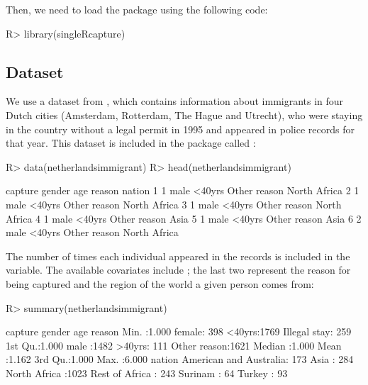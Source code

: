 \documentclass[
]{jss}
\newcommand{\1}{\mathcal{I}} \newcommand{\bZero}{\boldsymbol{0}}
\begin{document}
Then, we need to load the package using the following code:

\begin{CodeChunk}
\begin{CodeInput}
R> library(singleRcapture)
\end{CodeInput}
\end{CodeChunk}

\subsection{Dataset}\label{dataset}

We use a dataset from \cite{ztpoisson}, which contains information about
immigrants in four Dutch cities (Amsterdam, Rotterdam, The Hague and
Utrecht), who were staying in the country without a legal permit in 1995
and appeared in police records for that year. This dataset is included
in the package called :

\begin{CodeChunk}
\begin{CodeInput}
R> data(netherlandsimmigrant)
R> head(netherlandsimmigrant)
\end{CodeInput}
\begin{CodeOutput}
  capture gender    age       reason       nation
1       1   male <40yrs Other reason North Africa
2       1   male <40yrs Other reason North Africa
3       1   male <40yrs Other reason North Africa
4       1   male <40yrs Other reason         Asia
5       1   male <40yrs Other reason         Asia
6       2   male <40yrs Other reason North Africa
\end{CodeOutput}
\end{CodeChunk}

The number of times each individual appeared in the records is included
in the  variable. The available covariates include
; the last two represent the reason
for being captured and the region of the world a given person comes
from:

\begin{CodeChunk}
\begin{CodeInput}
R> summary(netherlandsimmigrant)
\end{CodeInput}
\begin{CodeOutput}
    capture         gender         age                reason    
 Min.   :1.000   female: 398   <40yrs:1769   Illegal stay: 259  
 1st Qu.:1.000   male  :1482   >40yrs: 111   Other reason:1621  
 Median :1.000                                                  
 Mean   :1.162                                                  
 3rd Qu.:1.000                                                  
 Max.   :6.000                                                  
                    nation    
 American and Australia: 173  
 Asia                  : 284  
 North Africa          :1023  
 Rest of Africa        : 243  
 Surinam               :  64  
 Turkey                :  93  
\end{CodeOutput}
\end{CodeChunk}
\end{document}
